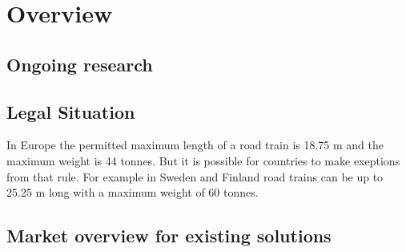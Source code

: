 \documentclass[ExampleMasters.tex]{subfiles}
\begin{document}
\clearpage
\chapter{Overview}
\section{Ongoing research}
\section{Legal Situation}
In Europe the permitted maximum length of a road train is 18.75 m and the maximum weight is 44 tonnes. But it is possible for countries to make exeptions from that rule.\cite{96/53/EC}  For example in Sweden and Finland road trains can be up to 25.25 m long with a  maximum weight of 60 tonnes.\cite{Vägverket}
\section{Market overview for existing solutions}
\end{document}
